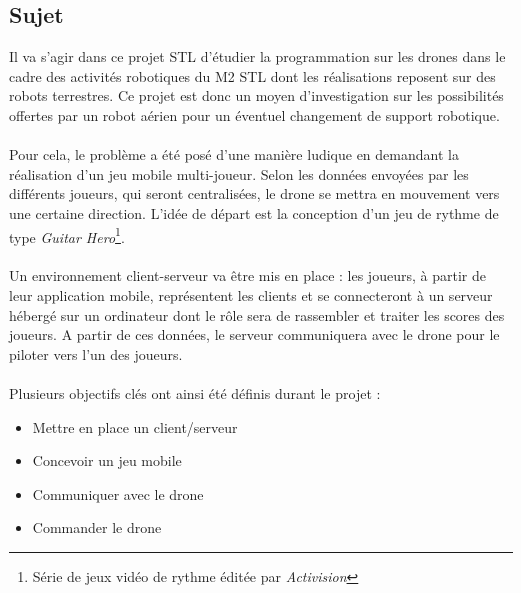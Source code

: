 \subsection{Sujet}

Il va s'agir dans ce projet STL d'étudier la programmation sur les drones dans le cadre des activités robotiques du M2 STL dont les réalisations reposent sur des robots terrestres. Ce projet est donc un moyen d'investigation sur les possibilités offertes par un robot aérien pour un éventuel changement de support robotique.

\paragraph{}
Pour cela, le problème a été posé d'une manière ludique en demandant la réalisation d'un jeu mobile multi-joueur. Selon les données envoyées par les différents joueurs, qui seront centralisées, le drone se mettra en mouvement vers une certaine direction. L'idée de départ est la conception d'un jeu de rythme de type \textit{Guitar Hero}\footnote{Série de jeux vidéo de rythme éditée par \textit{Activision}}.

\begin{figure}[h]
\begin{center}
\end{center}
\end{figure}

\paragraph{}
Un environnement client-serveur va être mis en place : les joueurs, à partir de leur application mobile, représentent les clients et se connecteront à un serveur hébergé sur un ordinateur dont le rôle sera de rassembler et traiter les scores des joueurs. A partir de ces données, le serveur communiquera avec le drone pour le piloter vers l'un des joueurs. 

\paragraph{}
Plusieurs objectifs clés ont ainsi été définis durant le projet :
\begin{itemize}
\item Mettre en place un client/serveur
\item Concevoir un jeu mobile
\item Communiquer avec le drone
\item Commander le drone
\end{itemize}